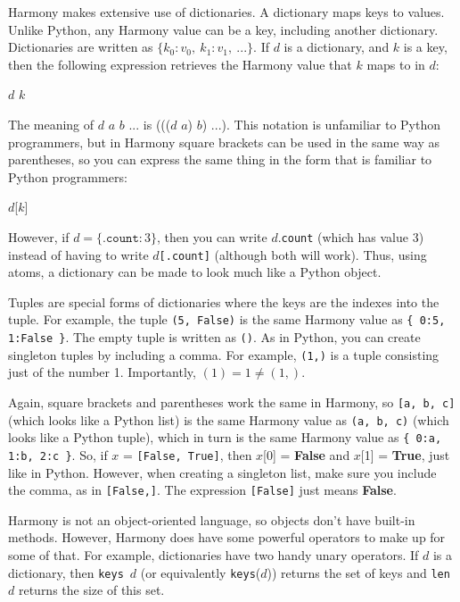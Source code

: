 \documentclass{report}
\newenvironment{code}{
\tcolorbox
}{
\endtcolorbox
}
\begin{document}
Harmony makes extensive use of dictionaries.
A dictionary maps keys to values.
Unlike Python, any Harmony value can be a key, including another
dictionary.
Dictionaries are written as
$\{ k_0: v_0, ~ k_1: v_1, ~ ... \}$.
If $d$ is a dictionary, and $k$ is a key, then the
following expression retrieves the Harmony value that $k$ maps to in $d$:
\begin{code}
$d$ $k$
\end{code}
The meaning of $d$ $a$ $b$ $...$ is ((($d$ $a$) $b$) $...$).
This notation is unfamiliar to Python programmers,
but in Harmony square brackets can be used
in the same way as parentheses, so you can express the same thing in the form
that is familiar to Python programmers:
\begin{code}
$d$[$k$]
\end{code}
However, if $d = \{ \mathtt{.count}: 3 \}$, then you can write
$d$.\texttt{count} (which has value 3) instead of having to write
$d$\texttt{[.count]} (although both will work).
Thus, using atoms, a dictionary can be made to look much like a Python object.

Tuples are special forms of dictionaries where the keys are
the indexes into the tuple.  For example, the tuple
\texttt{(5, False)} is the same Harmony value as
\texttt{\{ 0:5, 1:False \}}.
The empty tuple is written as \texttt{()}.
As in Python, you can create singleton tuples by including a comma.
For example, \texttt{(1,)} is a tuple consisting just of the number 1.
Importantly, $(1) = 1 \ne (1,)$.

Again, square brackets and parentheses work the same in Harmony, so
\texttt{[a, b, c]} (which looks like a Python list)
is the same Harmony value as \texttt{(a, b, c)} (which looks like a Python tuple),
which in turn is the same Harmony value as \texttt{\{ 0:a, 1:b, 2:c \}}.
So, if $x$ = \texttt{[False, True]},
then $x$[0] = \textbf{False} and $x$[1] = \textbf{True}, just like in Python.
However, when creating a singleton list, make sure you include the
comma, as in \texttt{[False,]}.  The expression \texttt{[False]} just means
\textbf{False}.

Harmony is not an object-oriented language, so objects don't have
built-in methods.  However, Harmony does have some powerful operators to
make up for some of that.
For example, dictionaries have two handy unary operators.
If $d$ is a
dictionary, then \texttt{keys}~$d$ (or equivalently \texttt{keys}($d$))
returns the set of keys and \texttt{len}~$d$ returns the size of
this set.
\end{document}
